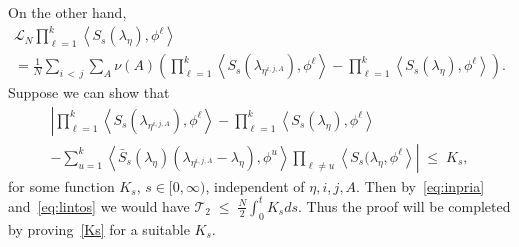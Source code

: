 \documentclass[10pt,a4paper]{article}
\renewcommand{\leq}{\;\leqslant\;}
\newcommand{\cL}{\mathcal{L}}
\newcommand{\cT}{\mathcal{T}}
\let\l=\lambda
\begin{document}
On the other hand,
\begin{multline}
\cL_N\prod_{\ell=1}^k\left\langle S_s(\l_{\eta}),\phi^\ell\right\rangle\\
=
\frac1{N} \sum_{i\,<\,j}\sum_A\nu(A) \left(\prod_{\ell=1}^k\left\langle S_s(\l_{\eta^{i,j,A}}),\phi^\ell\right\rangle -\prod_{\ell=1}^k\left\langle S_s(\l_{\eta}),\phi^\ell\right\rangle \right).
\end{multline}
Suppose we can show that
\begin{multline}\label{Ks}
\left|\prod_{\ell=1}^k\left\langle S_s(\l_{\eta^{i,j,A}}),\phi^\ell\right\rangle -\prod_{\ell=1}^k\left\langle S_s(\l_{\eta}),\phi^\ell\right\rangle\right.\\
-\left. \sum_{u=1}^k\left\langle \bar S_s(\l_\eta)(\l_{\eta^{i,j,A}} -\l_{\eta}),\phi^u\right\rangle\prod_{\ell\neq u}\left\langle S_s(\l_{\eta},\phi^\ell\right\rangle
\right|\leq K_s,
\end{multline}
for some function $K_s$, $s\in[0,\infty)$, independent of $\eta,i,j,A$. Then by~\eqref{eq:inpria} and~\eqref{eq:lintos} we would have $\cT_2\leq \frac{N}2\int_0^tK_s ds$. Thus the proof will be completed by proving~\eqref{Ks} for a suitable $K_s$.
\end{document}
